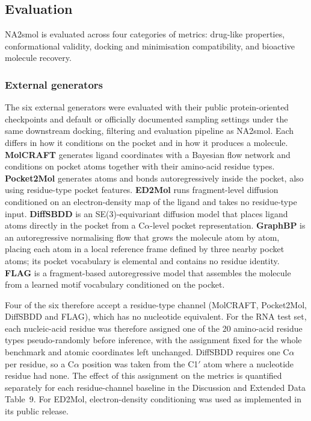 \documentclass[pdflatex,sn-mathphys-num]{sn-jnl}
\theoremstyle{thmstyleone}
\theoremstyle{thmstyletwo}
\theoremstyle{thmstylethree}
\begin{document}
\subsection{Evaluation}

NA2smol is evaluated across four categories of metrics: drug-like properties, conformational validity, docking and minimisation compatibility, and bioactive molecule recovery.

\subsubsection{External generators}

The six external generators were evaluated with their public protein-oriented checkpoints and default or officially documented sampling settings under the same downstream docking, filtering and evaluation pipeline as NA2smol. Each differs in how it conditions on the pocket and in how it produces a molecule. \textbf{MolCRAFT} generates ligand coordinates with a Bayesian flow network and conditions on pocket atoms together with their amino-acid residue types. \textbf{Pocket2Mol} generates atoms and bonds autoregressively inside the pocket, also using residue-type pocket features. \textbf{ED2Mol} runs fragment-level diffusion conditioned on an electron-density map of the ligand and takes no residue-type input. \textbf{DiffSBDD} is an SE(3)-equivariant diffusion model that places ligand atoms directly in the pocket from a C$\alpha$-level pocket representation. \textbf{GraphBP} is an autoregressive normalising flow that grows the molecule atom by atom, placing each atom in a local reference frame defined by three nearby pocket atoms; its pocket vocabulary is elemental and contains no residue identity. \textbf{FLAG} is a fragment-based autoregressive model that assembles the molecule from a learned motif vocabulary conditioned on the pocket.

Four of the six therefore accept a residue-type channel (MolCRAFT, Pocket2Mol, DiffSBDD and FLAG), which has no nucleotide equivalent. For the RNA test set, each nucleic-acid residue was therefore assigned one of the 20 amino-acid residue types pseudo-randomly before inference, with the assignment fixed for the whole benchmark and atomic coordinates left unchanged. DiffSBDD requires one C$\alpha$ per residue, so a C$\alpha$ position was taken from the C1$'$ atom where a nucleotide residue had none. The effect of this assignment on the metrics is quantified separately for each residue-channel baseline in the Discussion and Extended Data Table~9. For ED2Mol, electron-density conditioning was used as implemented in its public release.
\end{document}
